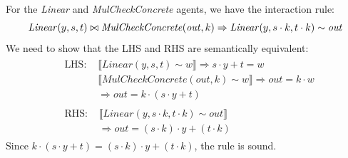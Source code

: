 \begin{lemma}
	For the \textit{Linear} and \textit{MulCheckConcrete} agents, we have the interaction rule:
	$$
	\mathit{Linear}(y, s, t) \bowtie \mathit{MulCheckConcrete}(\mathit{out}, k) \Rightarrow \mathit{Linear}(y, s \cdot k, t \cdot k) \sim \mathit{out} \\
	$$
	We need to show that the LHS and RHS are semantically equivalent:
	$$
	\begin{aligned}
		& \begin{aligned}
			\text{LHS: } & \llbracket \mathit{Linear}(y, s, t) \sim w \rrbracket \Rightarrow s \cdot y + t = w \\
			& \llbracket \mathit{MulCheckConcrete}(\mathit{out}, k) \sim w \rrbracket \Rightarrow \mathit{out} = k \cdot w \\
			& \Rightarrow \mathit{out} = k \cdot (s \cdot y + t)
		\end{aligned} \\
		& \begin{aligned}
			\text{RHS: } & \llbracket \mathit{Linear}(y, s \cdot k, t \cdot k) \sim \mathit{out} \rrbracket \\
			& \Rightarrow \mathit{out} = (s \cdot k) \cdot y + (t \cdot k)
		\end{aligned}
	\end{aligned}
	$$
	Since $k \cdot (s \cdot y + t) = (s \cdot k) \cdot y + (t \cdot k)$, the rule is sound.
\end{lemma}

